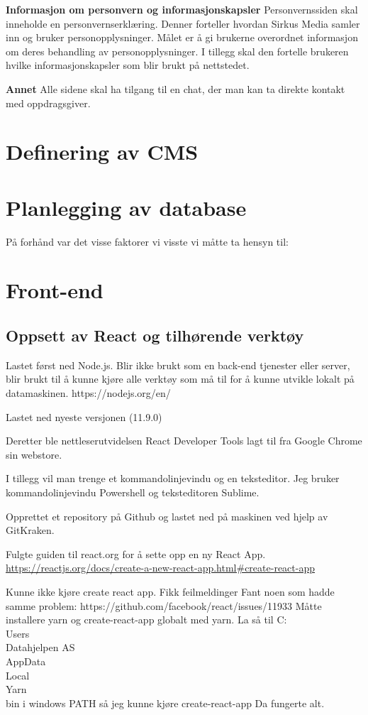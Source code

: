 \textbf{Informasjon om personvern og informasjonskapsler} Personvernssiden skal inneholde en personvernserklæring. Denner forteller hvordan Sirkus Media samler inn og bruker personopplysninger. Målet er å gi brukerne overordnet informasjon om deres behandling av personopplysninger. I tillegg skal den fortelle brukeren hvilke informasjonskapsler som blir brukt på nettstedet.

\textbf{Annet} Alle sidene skal ha tilgang til en chat, der man kan ta direkte kontakt med oppdragsgiver.

\section{Definering av CMS}

\section{Planlegging av database}

På forhånd var det visse faktorer vi visste vi måtte ta hensyn til:


\section{Front-end}

\subsection{Oppsett av React og tilhørende verktøy}

Lastet først ned Node.js. Blir ikke brukt som en back-end tjenester eller server, blir brukt til å kunne kjøre alle verktøy som må til for å kunne utvikle lokalt på datamaskinen. https://nodejs.org/en/

Lastet ned nyeste versjonen (11.9.0)

Deretter ble nettleserutvidelsen React Developer Tools lagt til fra Google Chrome sin webstore.

I tillegg vil man trenge et kommandolinjevindu og en teksteditor. Jeg bruker kommandolinjevindu Powershell og teksteditoren Sublime.

Opprettet et repository på Github og lastet ned på maskinen ved hjelp av GitKraken. 

Fulgte guiden til react.org for å sette opp en ny React App. \url{https://reactjs.org/docs/create-a-new-react-app.html\#create-react-app}



Kunne ikke kjøre create react app. Fikk feilmeldinger
Fant noen som hadde samme problem: https://github.com/facebook/react/issues/11933
Måtte installere yarn og create-react-app globalt med yarn.
La så til C:\\Users\\Datahjelpen AS\\AppData\\Local\\Yarn\\bin i windows PATH så jeg kunne kjøre create-react-app
Da fungerte alt.


\clearpage